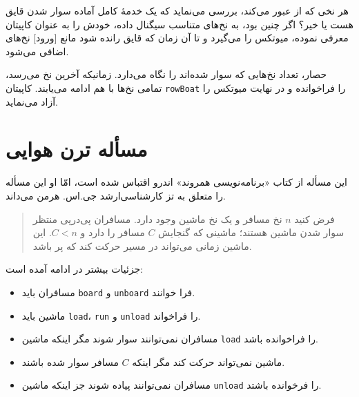 \documentclass{book}
\newcommand{\clearemptydoublepage}{}%
\begin{document}
    هر نخی که از  عبور می‌کند،‌ 
    بررسی می‌نماید که یک خدمهٔ کامل آماده سوار شدن قایق هست یا خیر؟ اگر چنین بود، به نخ‌های متناسب سیگنال داده، خودش را به عنوان کاپیتان 
    معرفی نموده، میوتکس را می‌گیرد و تا آن زمان که قایق رانده شود مانع [ورود] نخ‌های اضافی می‌شود. 

    حصار، تعداد نخ‌هایی که سوار شده‌اند را نگاه می‌دارد. زمانیکه آخرین نخ می‌رسد، تمامی نخ‌ها با هم ادامه می‌یابند. 
    کاپیتان  {\tt rowBoat} را فراخوانده و در نهایت میوتکس را آزاد می‌نماید. 
    


\clearemptydoublepage
\section{مسأله ترن هوایی}

    این مسأله از کتاب «برنامه‌نویسی همروند» اندرو اقتباس شده است، 
    امّا او این مسأله را متعلق به تز کارشناسی‌ارشد جی.‌اس. هرمن می‌داند. 

\begin {quotation}
    فرض کنید $n$ نخ مسافر و یک نخ ماشین وجود دارد. مسافران پی‌درپی منتظر سوار شدن ماشین هستند؛ ماشینی که گنجایش $C$  مسافر را دارد و $C<n$. 
    این ماشین زمانی می‌تواند در مسیر حرکت کند که پر باشد. 
\end{quotation}

    جزئیات بیشتر در ادامه آمده است:

\begin{itemize}

\item 
    مسافران باید {\tt board} و {\tt unboard} فرا خوانند. 

\item 
    ماشین باید {\tt load}، {\tt run} و {\tt unload} را فراخواند. 

\item 
    مسافران نمی‌توانند سوار شوند مگر اینکه ماشین {\tt load} را فراخوانده باشد. 

\item 
    ماشین نمی‌تواند حرکت کند مگر اینکه $C$ مسافر سوار شده باشند. 

\item 
    مسافران نمی‌توانند پیاده شوند جز اینکه ماشین {\tt unload} را فرخوانده باشتد. 

\end{itemize}
\end{document}
